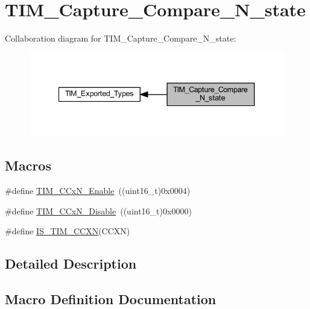 \hypertarget{group___t_i_m___capture___compare___n__state}{}\section{T\+I\+M\+\_\+\+Capture\+\_\+\+Compare\+\_\+\+N\+\_\+state}
\label{group___t_i_m___capture___compare___n__state}
Collaboration diagram for T\+I\+M\+\_\+\+Capture\+\_\+\+Compare\+\_\+\+N\+\_\+state\+:
\nopagebreak
\begin{figure}[H]
\begin{center}
\leavevmode
\includegraphics[width=340pt]{group___t_i_m___capture___compare___n__state}
\end{center}
\end{figure}
\subsection*{Macros}
\begin{DoxyCompactItemize}
\item 
\#define \hyperlink{group___t_i_m___capture___compare___n__state_gab534ddf23d317eb912564292c1cede2d}{T\+I\+M\+\_\+\+C\+Cx\+N\+\_\+\+Enable}~((uint16\+\_\+t)0x0004)
\item 
\#define \hyperlink{group___t_i_m___capture___compare___n__state_ga0d7d46aeba33ed197aa39775bc527d7d}{T\+I\+M\+\_\+\+C\+Cx\+N\+\_\+\+Disable}~((uint16\+\_\+t)0x0000)
\item 
\#define \hyperlink{group___t_i_m___capture___compare___n__state_gad5a9f961e44c8d7c24066ac37ec79cbc}{I\+S\+\_\+\+T\+I\+M\+\_\+\+C\+C\+XN}(C\+C\+XN)
\end{DoxyCompactItemize}


\subsection{Detailed Description}


\subsection{Macro Definition Documentation}
\mbox{\label{group___t_i_m___capture___compare___n__state_gad5a9f961e44c8d7c24066ac37ec79cbc}} 
